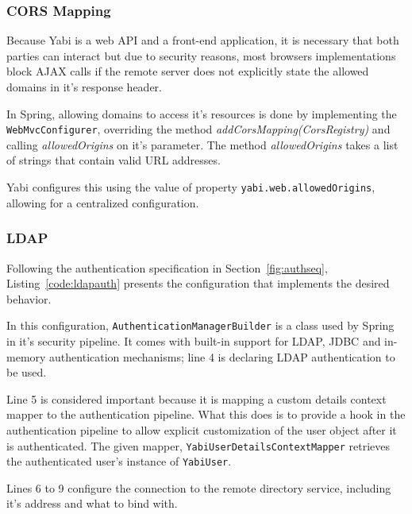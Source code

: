 \subsubsection{\gls{CORS} Mapping}

Because \gls{Yabi} is a web \gls{API} and a front-end application, it is necessary that both parties can interact but due to security reasons, most browsers implementations block \gls{AJAX} calls if the remote server does not explicitly state the allowed domains in it's response header.

In Spring, allowing domains to access it's resources is done by implementing the \texttt{WebMvcConfigurer}, overriding the method \textit{addCorsMapping(CorsRegistry)} and calling \textit{allowedOrigins} on it's parameter. The method \textit{allowedOrigins} takes a list of strings that contain valid \gls{URL} addresses.

\gls{Yabi} configures this using the value of property \texttt{yabi.web.allowedOrigins}, allowing for a centralized configuration.

\subsubsection{\gls{LDAP}}\label{impl:ldap}

Following the authentication specification in Section~\ref{fig:authseq}, Listing~\ref{code:ldapauth} presents the configuration that implements the desired behavior.



In this configuration, \texttt{AuthenticationManagerBuilder} is a class used by Spring in it's security pipeline. It comes with built-in support for \gls{LDAP}, \gls{JDBC} and in-memory authentication mechanisms; line 4 is declaring \gls{LDAP} authentication to be used.

Line 5 is considered important because it is mapping a custom details context mapper to the authentication pipeline. What this does is to provide a hook in the authentication pipeline to allow explicit customization of the user object after it is authenticated. The given mapper, \texttt{YabiUserDetailsContextMapper} retrieves the authenticated user's instance of \texttt{YabiUser}.

Lines 6 to 9 configure the connection to the remote directory service, including it's address and what to bind with.

